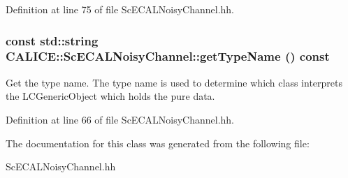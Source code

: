 Definition at line 75 of file ScECALNoisyChannel.hh.
\subsubsection[{getTypeName}]{\setlength{\rightskip}{0pt plus 5cm}const std::string CALICE::ScECALNoisyChannel::getTypeName () const\hspace{0.3cm}{\ttfamily  [inline]}}\label{classCALICE_1_1ScECALNoisyChannel_a135dee4f3a4657feea7c0169ac1560cb}


Get the type name. The type name is used to determine which class interprets the LCGenericObject which holds the pure data. 

Definition at line 66 of file ScECALNoisyChannel.hh.

The documentation for this class was generated from the following file:\begin{DoxyCompactItemize}
\item 
ScECALNoisyChannel.hh\end{DoxyCompactItemize}
